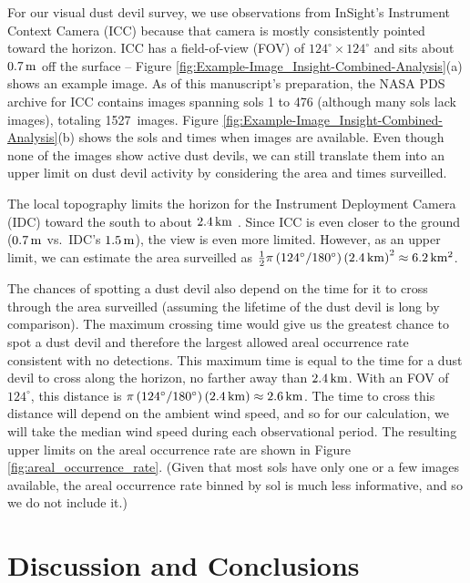 \documentclass{aastex63}
\newcommand{\numICCimages}{1527}
\begin{document}
For our visual dust devil survey, we use observations from InSight's Instrument Context Camera (ICC) because that camera is mostly consistently pointed toward the horizon. ICC has a field-of-view (FOV) of $124^\circ\times124^\circ$ and sits about $0.7\,{\rm m}$ off the surface \citep{2018SSRv..214..105M} -- Figure \ref{fig:Example-Image_Insight-Combined-Analysis}(a) shows an example image. As of this manuscript's preparation, the NASA PDS archive for ICC contains images spanning sols 1 to 476 (although many sols lack images), totaling \numICCimages\ images. Figure \ref{fig:Example-Image_Insight-Combined-Analysis}(b) shows the sols and times when images are available. Even though none of the images show active dust devils, we can still translate them into an upper limit on dust devil activity by considering the area and times surveilled. 

The local topography limits the horizon for the Instrument Deployment Camera (IDC) toward the south to about $2.4\,{\rm km}$ \citep{2020E&SS....701248G}. Since ICC is even closer to the ground ($0.7\,{\rm m}$ vs.~IDC's $1.5\,{\rm m}$), the view is even more limited. However, as an upper limit, we can estimate the area surveilled as $\frac{1}{2} \pi \left(124^\circ/180^\circ\right) \left( 2.4\,{\rm km} \right)^2 \approx 6.2\,{\rm km^2}$. 

The chances of spotting a dust devil also depend on the time for it to cross through the area surveilled (assuming the lifetime of the dust devil is long by comparison). The maximum crossing time would give us the greatest chance to spot a dust devil and therefore the largest allowed areal occurrence rate consistent with no detections. This maximum time is equal to the time for a dust devil to cross along the horizon, no farther away than $2.4\,{\rm km}$. With an FOV of $124^\circ$, this distance is $\pi \left(124^\circ/180^\circ\right) \left( 2.4\,{\rm km} \right) \approx 2.6\,{\rm km}$. The time to cross this distance will depend on the ambient wind speed, and so for our calculation, we will take the median wind speed during each observational period. The resulting upper limits on the areal occurrence rate are shown in Figure \ref{fig:areal_occurrence_rate}. (Given that most sols have only one or a few images available, the areal occurrence rate binned by sol is much less informative, and so we do not include it.) 

\section{Discussion and Conclusions}
\label{sec:Discussion and Conclusions}
\end{document}
